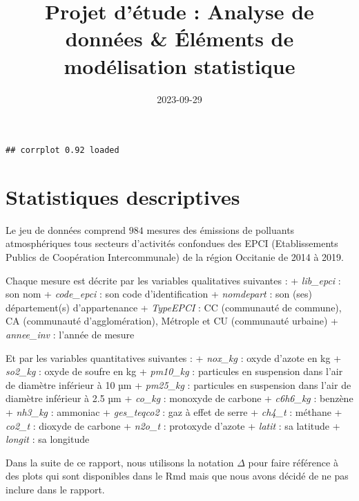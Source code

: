 \documentclass[
]{article}
\title{Projet d'étude : Analyse de données \& Éléments de modélisation
statistique}
\author{}
\date{\vspace{-2.5em}2023-09-29}
\begin{document}
\maketitle

\begin{verbatim}
## corrplot 0.92 loaded
\end{verbatim}

\hypertarget{statistiques-descriptives}{%
\section{Statistiques descriptives}\label{statistiques-descriptives}}

Le jeu de données comprend \(984\) mesures des émissions de polluants
atmosphériques tous secteurs d'activités confondues des EPCI
(Etablissements Publics de Coopération Intercommunale) de la région
Occitanie de 2014 à 2019.

Chaque mesure est décrite par les variables qualitatives suivantes : +
\emph{lib\_epci} : son nom + \emph{code\_epci} : son code
d'identification + \emph{nomdepart} : son (ses) département(s)
d'appartenance + \emph{TypeEPCI} : CC (communauté de commune), CA
(communauté d'agglomération), Métrople et CU (communauté urbaine) +
\emph{annee\_inv} : l'année de mesure

Et par les variables quantitatives suivantes : + \emph{nox\_kg} : oxyde
d'azote en kg + \emph{so2\_kg} : oxyde de soufre en kg + \emph{pm10\_kg}
: particules en suspension dans l'air de diamètre inférieur à 10 µm +
\emph{pm25\_kg} : particules en suspension dans l'air de diamètre
inférieur à 2.5 µm + \emph{co\_kg} : monoxyde de carbone +
\emph{c6h6\_kg} : benzène + \emph{nh3\_kg} : ammoniac +
\emph{ges\_teqco2} : gaz à effet de serre + \emph{ch4\_t} : méthane +
\emph{co2\_t} : dioxyde de carbone + \emph{n2o\_t} : protoxyde d'azote +
\emph{latit} : sa latitude + \emph{longit} : sa longitude

Dans la suite de ce rapport, nous utilisons la notation \(\Delta\) pour
faire référence à des plots qui sont disponibles dans le Rmd mais que
nous avons décidé de ne pas inclure dans le rapport.
\end{document}
